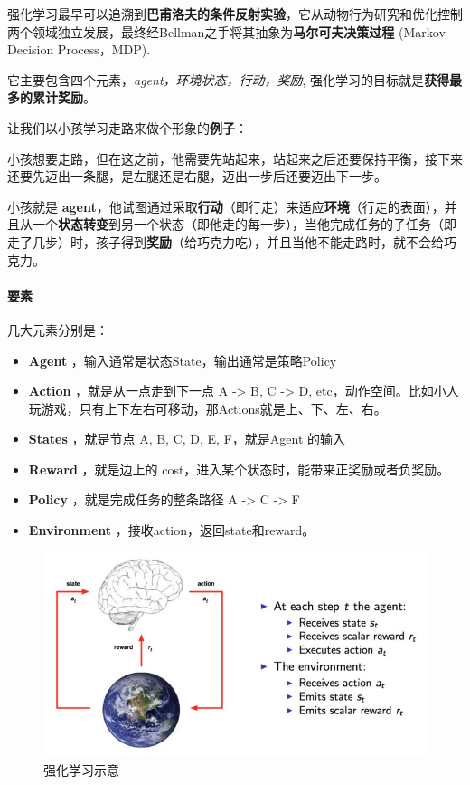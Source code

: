 \documentclass[UTF8,a4paper,12pt]{ctexbook}
\begin{document}
			强化学习最早可以追溯到\textbf{巴甫洛夫的条件反射实验}，它从动物行为研究和优化控制两个领域独立发展，最终经Bellman之手将其抽象为\textbf{马尔可夫决策过程} (Markov Decision Process，MDP).
			
			它主要包含四个元素，\textit{agent，环境状态，行动，奖励}, 强化学习的目标就是\textbf{获得最多的累计奖励}。
			
			
			让我们以小孩学习走路来做个形象的\textbf{例子}：
			
			小孩想要走路，但在这之前，他需要先站起来，站起来之后还要保持平衡，接下来还要先迈出一条腿，是左腿还是右腿，迈出一步后还要迈出下一步。
			
			小孩就是 \textbf{agent}，他试图通过采取\textbf{行动}（即行走）来适应\textbf{环境}（行走的表面），并且从一个\textbf{状态转变}到另一个状态（即他走的每一步），当他完成任务的子任务（即走了几步）时，孩子得到\textbf{奖励}（给巧克力吃），并且当他不能走路时，就不会给巧克力。
			
			\paragraph{要素}
				几大元素分别是：
				
				\begin{itemize}
					\item \textbf{Agent}  ，输入通常是状态State，输出通常是策略Policy
					\item \textbf{Action} ，就是从一点走到下一点 {A -> B, C -> D, etc}，动作空间。比如小人玩游戏，只有上下左右可移动，那Actions就是上、下、左、右。
					\item \textbf{States} ，就是节点 {A, B, C, D, E, F}，就是Agent 的输入
					\item \textbf{Reward} ，就是边上的 cost，进入某个状态时，能带来正奖励或者负奖励。
					\item \textbf{Policy} ，就是完成任务的整条路径 {A -> C -> F}
					\item \textbf{Environment} ，接收action，返回state和reward。
				\end{itemize}
				
				\begin{figure}[H]
					\centering
					\includegraphics[width=\linewidth]{RL_Basic}
					\caption{强化学习示意}
				\end{figure}
				
\end{document}
